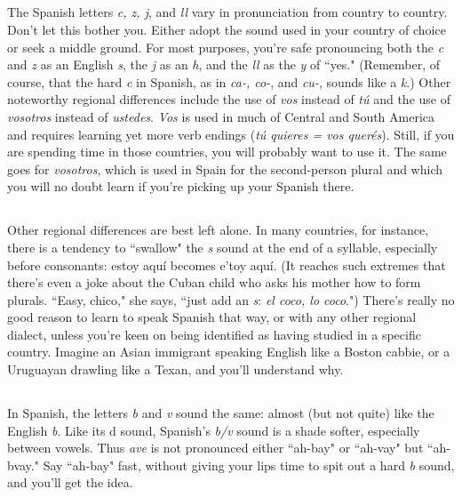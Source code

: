 \subsection{}

The Spanish letters \emph{c, z, j}, and \emph{ll} vary in pronunciation
from country to country. Don't let this bother you. Either adopt the
sound used in your country of choice or seek a middle ground. For
most purposes, you're safe pronouncing both the \emph{c} and \emph{z} as an English
\emph{s}, the \emph{j} as an \emph{h}, and the \emph{ll} as the \emph{y} of ``yes." (Remember, of course, that
the hard \emph{c} in Spanish, as in \emph{ca-, co-}, and \emph{cu-}, sounds like a \emph{k}.) Other
noteworthy regional differences include the use of \emph{vos} instead of \emph{tú}
and the use of \emph{vosotros} instead of \emph{ustedes}. \emph{Vos} is used in much of
Central and South America and requires learning yet more verb endings (\emph{tú quieres = vos querés}). Still, if you are spending time in those
countries, you will probably want to use it. The same goes for \emph{vosotros}, which is used in Spain for the second-person plural and which
you will no doubt learn if you're picking up your Spanish there.

\subsection{}

Other regional differences are best left alone. In many
countries, for instance, there is a tendency to ``swallow" the \emph{s} sound at
the end of a syllable, especially before consonants: estoy aquí becomes
e'toy aquí. (It reaches such extremes that there's even a joke about the
Cuban child who asks his mother how to form plurals. ``Easy, chico,"
she says, ``just add an \emph{s}: \emph{el coco, lo coco}.") There's really no good reason to learn to speak Spanish that way, or with any other regional dialect, unless you're keen on being identified as having studied in a specific country. Imagine an Asian immigrant speaking English like a
Boston cabbie, or a Uruguayan drawling like a Texan, and you'll understand why.

\subsection{}

In Spanish, the letters \emph{b} and \emph{v} sound the same: almost (but
not quite) like the English \emph{b}. Like its d sound, Spanish's \emph{b/v} sound is a
shade softer, especially between vowels. Thus \emph{ave} is not pronounced
either ``ah-bay" or ``ah-vay" but ``ah-bvay." Say ``ah-bay" fast, without
giving your lips time to spit out a hard \emph{b} sound, and you'll get the idea.

